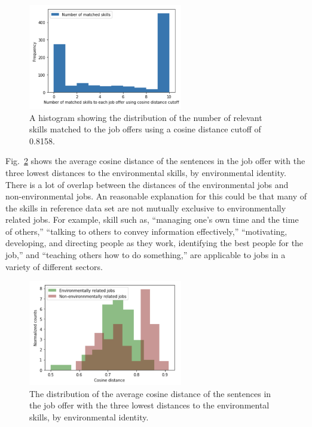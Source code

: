 \begin{figure}[htbp]
  \centering
    \includegraphics[width=0.6\textwidth]{figures/NumSkillsMatches.pdf}
    \caption{
    A histogram showing the distribution of the number of relevant skills matched to the job offers using a cosine distance cutoff of 0.8158. 
    }
\label{fig:NumSkillsMatches}
\end{figure}

Fig.~\ref{fig:SkillGreen} shows the average cosine distance of the sentences in the job offer with the three lowest distances to the environmental skills, by environmental identity. There is a lot of overlap between the distances of the environmental jobs and non-environmental jobs. An reasonable explanation for this could be that many of the skills in reference data set are not mutually exclusive to environmentally related jobs. For example, skill such as, ``managing one's own time and the time of others,'' ``talking to others to convey information effectively,'' ``motivating, developing, and directing people as they work, identifying the best people for the job,'' and ``teaching others how to do something,'' are applicable to jobs in a variety of different sectors. 

\begin{figure}[htbp]
  \centering
    \includegraphics[width=0.6\textwidth]{figures/SkillGreen.pdf}
    \caption{
    The distribution of the average cosine distance of the sentences in the job offer with the three lowest distances to the environmental skills, by environmental identity. 
    }
\label{fig:SkillGreen}
\end{figure}

